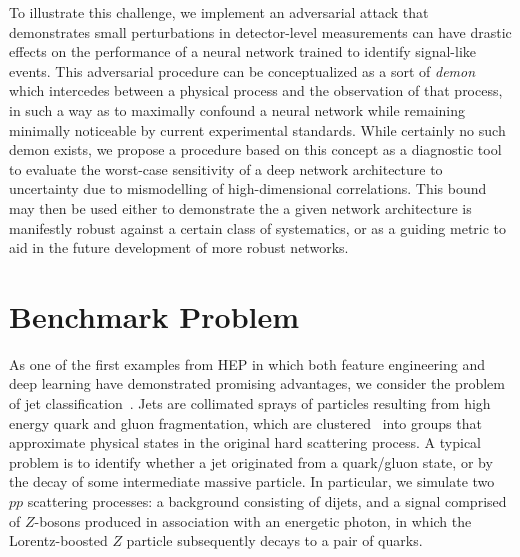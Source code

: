 \documentclass[reprint,nofootinbib,...]{revtex4-1}
\begin{document}

To illustrate this challenge, we implement an adversarial attack that demonstrates small perturbations in detector-level measurements can have drastic effects on the performance of a neural network trained to identify signal-like events.
This adversarial procedure can be conceptualized as a sort of \textit{demon}~\cite{TheLordKelvin} which intercedes between a physical process and the observation of that process, in such a way as to maximally confound a neural network while remaining minimally noticeable by current experimental standards.
While certainly no such demon exists, we propose a procedure based on this concept as a diagnostic tool to evaluate the worst-case sensitivity of a deep network architecture to uncertainty due to mismodelling of high-dimensional correlations.
This bound may then be used either to demonstrate the a given network architecture is manifestly robust against a certain class of systematics, or as a guiding metric to aid in the future development of more robust networks.

\section{Benchmark Problem}

As one of the first examples from HEP in which both feature engineering and deep learning have demonstrated promising advantages, we consider the problem of jet classification~\cite{Larkoski:2017jix}.
Jets are collimated sprays of particles resulting from high energy quark and gluon fragmentation, which are clustered~\cite{Cacciari:2008gp} into groups that approximate physical states in the original hard scattering process.
A typical problem is to identify whether a jet originated from a quark/gluon state, or by the decay of some intermediate massive particle.
In particular, we simulate two $pp$ scattering processes: a background consisting of dijets, and a signal comprised of $Z$-bosons produced in association with an energetic photon, in which the Lorentz-boosted $Z$ particle subsequently decays to a pair of quarks.
\end{document}
